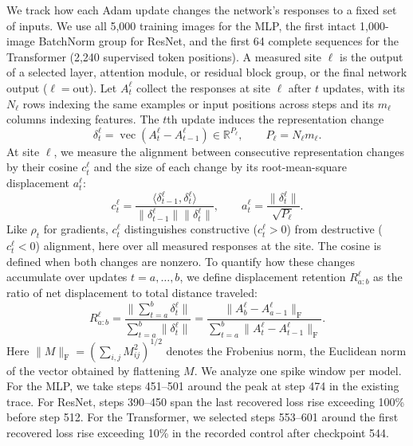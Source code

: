 We track how each Adam update changes the network's responses to a fixed set of inputs. We use all 5,000 training images for the MLP, the first intact 1,000-image BatchNorm group for ResNet, and the first 64 complete sequences for the Transformer (2,240 supervised token positions). A measured site $\ell$ is the output of a selected layer, attention module, or residual block group, or the final network output ($\ell=\mathrm{out}$). Let $A_t^\ell$ collect the responses at site $\ell$ after $t$ updates, with its $N_\ell$ rows indexing the same examples or input positions across steps and its $m_\ell$ columns indexing features. The $t$th update induces the representation change
\begin{equation}
 \delta_t^\ell=\operatorname{vec}(A_t^\ell-A_{t-1}^\ell)
 \in\mathbb R^{P_\ell},\qquad P_\ell=N_\ell m_\ell.
 \label{eq:representation-change}
\end{equation}
At site $\ell$, we measure the alignment between consecutive representation changes by their cosine $c_t^\ell$ and the size of each change by its root-mean-square displacement $a_t^\ell$:
\begin{equation}
 c_t^\ell=
 \frac{\langle\delta_{t-1}^\ell,\delta_t^\ell\rangle}
 {\|\delta_{t-1}^\ell\|\|\delta_t^\ell\|},\qquad
 a_t^\ell=\frac{\|\delta_t^\ell\|}{\sqrt{P_\ell}}.
 \label{eq:representation-motion}
\end{equation}
Like $\rho_t$ for gradients, $c_t^\ell$ distinguishes constructive ($c_t^\ell>0$) from destructive ($c_t^\ell<0$) alignment, here over all measured responses at the site. The cosine is defined when both changes are nonzero. To quantify how these changes accumulate over updates $t=a,\ldots,b$, we define displacement retention $R_{a:b}^\ell$ as the ratio of net displacement to total distance traveled:
\begin{equation}
 R_{a:b}^\ell=
 \frac{\|\sum_{t=a}^b\delta_t^\ell\|}{\sum_{t=a}^b\|\delta_t^\ell\|}
 =\frac{\|A_b^\ell-A_{a-1}^\ell\|_{\mathrm{F}}}
 {\sum_{t=a}^b\|A_t^\ell-A_{t-1}^\ell\|_{\mathrm{F}}}.
 \label{eq:representation-retention}
\end{equation}
Here $\|M\|_{\mathrm{F}}=(\sum_{i,j}M_{ij}^2)^{1/2}$ denotes the Frobenius norm, the Euclidean norm of the vector obtained by flattening $M$.
We analyze one spike window per model. For the MLP, we take steps 451--501 around the peak at step 474 in the existing trace. For ResNet, steps 390--450 span the last recovered loss rise exceeding 100\% before step 512. For the Transformer, we selected steps 553--601 around the first recovered loss rise exceeding 10\% in the recorded control after checkpoint 544.

